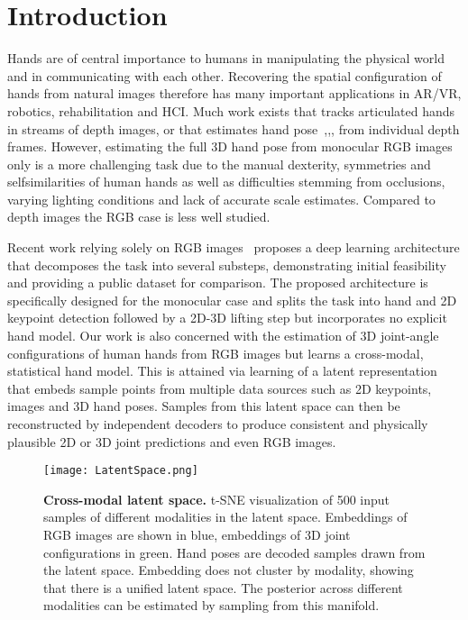 \documentclass[10pt,twocolumn,letterpaper]{article}
\begin{document}
\section{Introduction}
Hands are of central importance to humans in manipulating
the physical world and in communicating with each
other. Recovering the spatial configuration of hands from
natural images therefore has many important applications
in AR/VR, robotics, rehabilitation and HCI. Much work exists
that tracks articulated hands in streams of depth images,
or that estimates hand pose~\cite{Oberweger2017DeepPrior},\cite{Oberweger2015Hands},\cite{Tang_2014_Latent},\cite{Wan2016Hand} from individual
depth frames. However, estimating the full 3D hand
pose from monocular RGB images only is a more challenging
task due to the manual dexterity, symmetries and selfsimilarities
of human hands as well as difficulties stemming
from occlusions, varying lighting conditions and lack of accurate
scale estimates. Compared to depth images the RGB
case is less well studied.\par
Recent work relying solely on RGB images~\cite{T_2017_L} proposes
a deep learning architecture that decomposes the task
into several substeps, demonstrating initial feasibility and
providing a public dataset for comparison. The proposed
architecture is specifically designed for the monocular case
and splits the task into hand and 2D keypoint detection followed
by a 2D-3D lifting step but incorporates no explicit
hand model. Our work is also concerned with the estimation
of 3D joint-angle configurations of human hands from RGB
images but learns a cross-modal, statistical hand model.
This is attained via learning of a latent representation that
embeds sample points from multiple data sources such as
2D keypoints, images and 3D hand poses. Samples from
this latent space can then be reconstructed by independent
decoders to produce consistent and physically plausible 2D
or 3D joint predictions and even RGB images.\par

\begin{figure}[!htp]
\begin{center}
   \texttt{[image: LatentSpace.png]}
\end{center}
   \caption{\textbf{Cross-modal latent space.} t-SNE visualization
of 500 input samples of different modalities in the latent
space. Embeddings of RGB images are shown in blue, embeddings
of 3D joint configurations in green. Hand poses
are decoded samples drawn from the latent space. Embedding
does not cluster by modality, showing that there is a
unified latent space. The posterior across different modalities
can be estimated by sampling from this manifold.}
\label{fig:Space}
\end{figure}
\end{document}
